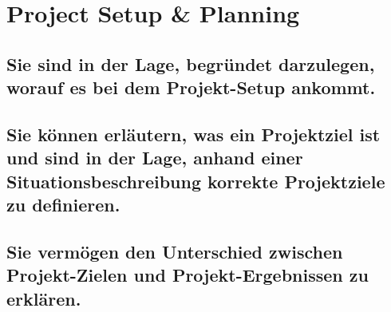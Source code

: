 \chapter{Project Setup \& Planning}

\section{Sie sind in der Lage, begründet darzulegen, worauf es bei dem Projekt-Setup ankommt.}

\section{Sie können erläutern, was ein Projektziel ist und sind in der Lage, anhand einer Situationsbeschreibung korrekte Projektziele zu definieren.}

\section{Sie vermögen den Unterschied zwischen Projekt-Zielen und Projekt-Ergebnissen zu erklären.}